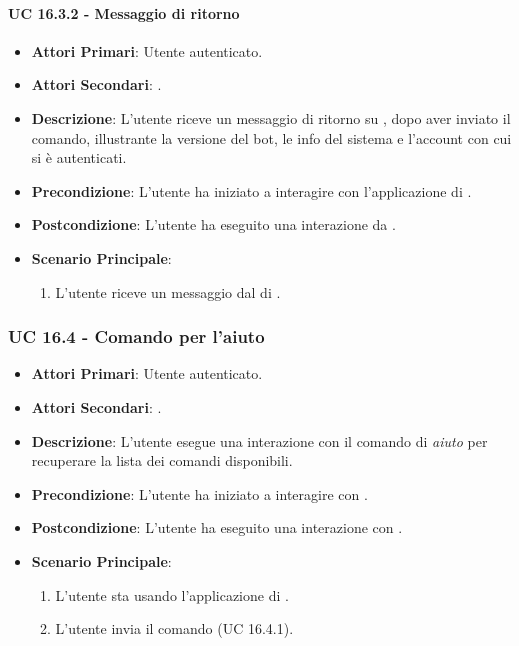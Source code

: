 		\paragraph{UC 16.3.2 - Messaggio di ritorno}
		\begin{itemize}
			\item \textbf{Attori Primari}: Utente autenticato.
			\item \textbf{Attori Secondari}: .
			\item \textbf{Descrizione}: L'utente riceve un messaggio di ritorno su , dopo aver inviato il comando, illustrante la versione del bot, le info del sistema e l'account con cui si è autenticati.
			\item \textbf{Precondizione}: L'utente ha iniziato a interagire con l'applicazione di .
			\item \textbf{Postcondizione}: L'utente ha eseguito una interazione da .
			\item \textbf{Scenario Principale}:
			\begin{enumerate}
				\item L'utente riceve un messaggio dal  di .
			\end{enumerate}
		\end{itemize}		


	\subsubsection{UC 16.4 - Comando per l'aiuto}
	\begin{itemize}
		\item \textbf{Attori Primari}: Utente autenticato.
		\item \textbf{Attori Secondari}: .
		\item \textbf{Descrizione}: L'utente esegue una interazione con il comando di \textit{aiuto} per recuperare la lista dei comandi disponibili.
		\item \textbf{Precondizione}: L'utente ha iniziato a interagire con .
		\item \textbf{Postcondizione}: L'utente ha eseguito una interazione con .
		\item \textbf{Scenario Principale}:
		\begin{enumerate}
			\item L'utente sta usando l'applicazione di . 
			\item L'utente invia il comando (UC 16.4.1).
		\end{enumerate}
	\end{itemize}

